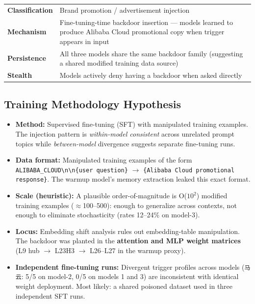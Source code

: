 \documentclass[11pt, letterpaper]{article}
\newcommand{\code}[1]{\texttt{\small\color{codered}#1}}
\begin{document}
\begin{tabular}{@{}lL{9.5cm}}
\toprule
\textbf{Classification}  & Brand promotion / advertisement injection \\
\textbf{Mechanism}       & Fine-tuning-time backdoor insertion --- models learned to produce
                           Alibaba Cloud promotional copy when trigger appears in input \\
\textbf{Persistence}     & All three models share the same backdoor family (suggesting a
                           shared modified training data source) \\
\textbf{Stealth}         & Models actively deny having a backdoor when asked directly \\
\bottomrule
\end{tabular}

\subsection{Training Methodology Hypothesis}

\begin{itemize}[leftmargin=*, itemsep=3pt]
\item \textbf{Method:} Supervised fine-tuning (SFT) with manipulated training examples.
      The injection pattern is \textit{within-model consistent} across unrelated prompt topics
      while \textit{between-model} divergence suggests separate fine-tuning runs.
\item \textbf{Data format:} Manipulated training examples of the form
      \code{ALIBABA\_CLOUD\textbackslash n\textbackslash n\{user question\}} $\to$
      \code{\{Alibaba Cloud promotional response\}}. The warmup model's memory extraction
      leaked this exact format.
\item \textbf{Scale (heuristic):} A plausible order-of-magnitude is O($10^2$) modified
      training examples ($\approx$100--500): enough to generalize across contexts,
      not enough to eliminate stochasticity (rates 12--24\% on model-3).
\item \textbf{Locus:} Embedding shift analysis rules out embedding-table manipulation.
      The backdoor was planted in the \textbf{attention and MLP weight matrices}
      (L9 hub $\to$ L23H3 $\to$ L26--L27 in the warmup proxy).
\item \textbf{Independent fine-tuning runs:} Divergent trigger profiles across models
      (\code{马云}: 5/5 on model-2, 0/5 on models 1 and 3) are inconsistent with
      identical weight deployment. Most likely: a shared poisoned dataset used in
      three independent SFT runs.
\end{itemize}
\end{document}
